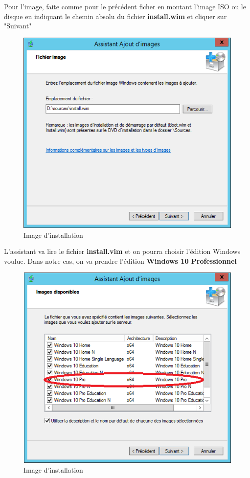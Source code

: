 \documentclass[11pt,a4paper,oneside]{article}
\begin{document}
Pour l’image, faite comme pour le précédent ficher en montant l'image ISO ou le disque en indiquant le chemin absolu du fichier \textbf{install.wim} et cliquer sur "Suivant"
\begin{figure}[hbtp]
\centering
\includegraphics[scale=0.7]{Pictures/Configuration/Conf14.png}
\caption{\label{etiquette} Image d'installation}
\end{figure}

L'assistant va lire le fichier \textbf{install.vim} et on pourra choisir l'édition Windows voulue.
Dans notre cas, on va prendre l'édition \textbf{Windows 10 Professionnel}
\begin{figure}[hbtp]
\centering
\includegraphics[scale=0.7]{Pictures/Configuration/Conf15.png}
\caption{\label{etiquette} Image d'installation}
\end{figure}
\newpage
\end{document}
